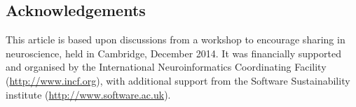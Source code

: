 \documentclass[11pt]{article}
\begin{document}
\subsection*{Acknowledgements}

This article is based upon discussions from a workshop to encourage
sharing in neuroscience, held in Cambridge, December 2014.  It was
financially supported and organised by the International
Neuroinformatics Coordinating Facility (\url{http://www.incf.org}),
with additional support from the Software Sustainability institute
(\url{http://www.software.ac.uk}).



\printbibliography
\end{document}
